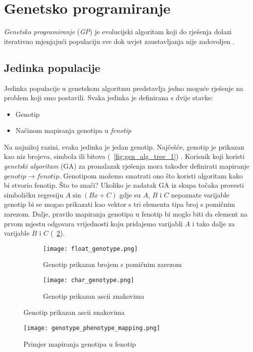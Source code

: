 \section{Genetsko programiranje}
\emph{Genetsko programiranje} (\emph{GP}) je evolucijski algoritam koji do rješenja dolazi iterativno mjenjajući populaciju sve dok uvjet zaustavljanja nije zadovoljen \cite{conv_gen_programming}.

\subsection{Jedinka populacije}
Jedinka populacije u genetskom algoritmu predstavlja jedno moguće rješenje na problem koji smo postavili.
Svaka jedinka je definirana s dvije stavke:
\begin{itemize}
	\item{Genotip}
	\item{Načinom mapiranja genotipa u \emph{fenotip}}
\end{itemize}
Na najnižoj razini, svaka jedinka je jedan genotip. 
Najčešće, genotip je prikazan kao niz brojeva, simbola ili bitova (~\ref{fig:gen_alg_tree_1}) \cite{naturally_selecting_algorithms}.
Korisnik koji koristi \emph{genetski algoritam} (GA) za pronalazak rješenja mora također definirati mapiranje $genotip \rightarrow fenotip$.
Genotipom možemo smatrati ono što koristi algoritam kako bi stvorio fenotip.
Što to znači?
Ukoliko je zadatak GA iz skupa točaka provesti simboličku regresiju $A\sin(Bx + C)$ gdje su $A$, $B$ i $C$ nepoznate varijable genotip bi se mogao prikazati kao vektor s tri elementa tipa broj s pomičnim zarezom.
Dalje, pravilo mapiranja genotipa u fenotip bi moglo biti da element na prvom mjestu odgovara vrijednosti koju pridajemo varijabli $A$ i tako dalje za varijable $B$ i $C$ (~\ref{fig:genotype_phenotype_map}).

\begin{figure}
	\caption{Mogućnosti spremanja i korištenja genotipa tijekom izvođenja genetskog algoritma}
	\begin{subfigure}[t]{0.45\textwidth}
		\texttt{[image: float\_genotype.png]}
		\caption{Genotip prikazan brojem s pomičnim zarezom}
	\end{subfigure}
	\hspace{\fill}
	\begin{subfigure}[t]{0.45\textwidth}
		\texttt{[image: char\_genotype.png]}
		\caption{Genotip prikazan ascii znakovima}
	\end{subfigure}
	\label{fig:genotype_types}
\end{figure}

\begin{figure}
	\texttt{[image: genotype\_phenotype\_mapping.png]}
	\caption{Primjer mapiranja genotipa u fenotip}
	\label{fig:genotype_phenotype_map}
\end{figure}
